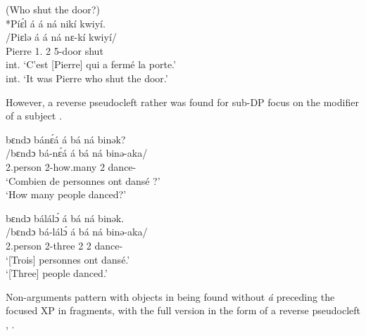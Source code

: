 \documentclass[output=paper,colorlinks,citecolor=brown
]{langscibook}
\begin{document}
\ea (Who shut the door?) \\
\glll
*{\db}Píɛ́l á á ná nikí kwiyí. \\
/Piɛlə á á ná nɛ-kí kwiyí/ \\
{\db}Pierre \COP{} 1\SM{}.\REL{} \PST{}2{} 5-door shut \\
\glt
int. `C'est [Pierre]\textsubscript{\FOC{}} qui a fermé la porte.' \\ int. `It was Pierre who shut the door.' \jambox*{[EO 276] }

\z

However, a reverse pseudocleft rather was found for sub-DP focus on the modifier of a subject .

\ea \label{cleftdance}
\begin{xlist}
\glll
{\db}bɛndɔ bá\ds{}nɛ́á á \ds{}bá ná binək? \\
/bɛndɔ bá-nɛ́á á bá ná binə-aka/ \\
{\db}2.person 2-how.many \COP{} 2\SM{} \PST{} dance-\DUR{} \\
\glt
`Combien de personnes ont dansé ?' \\ `How many people danced?' \jambox*{[PM 1211] }
\end{xlist}

\begin{xlist}
\glll
{\db}bɛndɔ bálálɔ́ á bá ná binək. \\
/bɛndɔ bá-lálɔ́ á bá ná binə-aka/ \\
{\db}2.person 2-three \COP{} 2\SM{} \PST{}2{} dance-\DUR{} \\
\glt
`[Trois]\textsubscript{\FOC{}} personnes ont dansé.' \\ `[Three]\textsubscript{\FOC{}} people danced.' \jambox*{[PM 1214] }
\end{xlist}
\z

Non-arguments pattern with objects in being found without \textit{á} preceding the focused XP in fragments, with the full version in the form of a reverse pseudocleft , .
\end{document}
